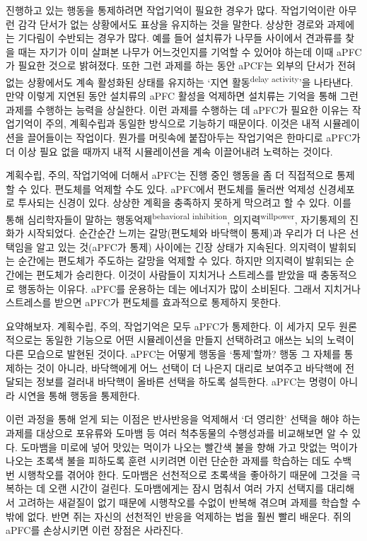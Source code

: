 \documentclass[openany]{book}
\begin{document}
\begin{appendices}
진행하고 있는 행동을 통제하려면 작업기억이 필요한 경우가 많다. 작업기억이란 아무런 감각 단서가 없는 상황에서도 표상을 유지하는 것을 말한다. 상상한 경로와 과제에는 기다림이 수반되는 경우가 많다. 예를 들어 설치류가 나무들 사이에서 견과류를 찾을 때는 자기가 이미 살펴본 나무가 어느것인지를 기억할 수 있어야 하는데 이때 aPFC가 필요한 것으로 밝혀졌다. 또한 그런 과제를 하는 동안 aPCF는 외부의 단서가 전혀 없는 상황에서도 계속 활성화된 상태를 유지하는 `지연 활동\textsuperscript{delay activity}’을 나타낸다. 만약 이렇게 지연된 동안 설치류의 aPFC 활성을 억제하면 설치류는 기억을 통해 그런 과제를 수행하는 능력을 상실한다. 이런 과제를 수행하는 데 aPFC가 필요한 이유는 작업기억이 주의, 계획수립과 동일한 방식으로 기능하기 때문이다. 이것은 내적 시뮬레이션을 끌어들이는 작업이다. 뭔가를 머릿속에 붙잡아두는 작업기억은 한마디로 aPFC가 더 이상 필요 없을 때까지 내적 시뮬레이션을 계속 이끌어내려 노력하는 것이다.

계획수립, 주의, 작업기억에 더해서 aPFC는 진행 중인 행동을 좀 더 직접적으로 통제할 수 있다. 편도체를 억제할 수도 있다. aPFC에서 편도체를 둘러싼 억제성 신경세포로 투사되는 신경이 있다. 상상한 계획을 충족하지 못하게 막으려고 할 수 있다. 이를 통해 심리학자들이 말하는 행동억제\textsuperscript{behavioral inhibition}, 의지력\textsuperscript{willpower}, 자기통제의 진화가 시작되었다. 순간순간 느끼는 갈망(편도체와 바닥핵이 통제)과 우리가 더 나은 선택임을 알고 있는 것(aPFC가 통제) 사이에는 긴장 상태가 지속된다. 의지력이 발휘되는 순간에는 편도체가 주도하는 갈망을 억제할 수 있다. 하지만 의지력이 발휘되는 순간에는 편도체가 승리한다. 이것이 사람들이 지치거나 스트레스를 받았을 때 충동적으로 행동하는 이유다. aPFC를 운용하는 데는 에너지가 많이 소비된다. 그래서 지치거나 스트레스를 받으면 aPFC가 편도체를 효과적으로 통제하지 못한다.

요약해보자. 계획수립, 주의, 작업기억은 모두 aPFC가 통제한다. 이 세가지 모두 원론적으로는 동일한 기능으로 어떤 시뮬레이션을 만들지 선택하려고 애쓰는 뇌의 노력이 다른 모습으로 발현된 것이다. aPFC는 어떻게 행동을 `통제’할까? 행동 그 자체를 통제하는 것이 아니라, 바닥핵에게 어느 선택이 더 나은지 대리로 보여주고 바닥핵에 전달되는 정보를 걸러내 바닥핵이 올바른 선택을 하도록 설득한다. aPFC는 명령이 아니라 시연을 통해 행동을 통제한다.

이런 과정을 통해 얻게 되는 이점은 반사반응을 억제해서 `더 영리한’ 선택을 해야 하는 과제를 대상으로 포유류와 도마뱀 등 여러 척추동물의 수행성과를 비교해보면 알 수 있다. 도마뱀을 미로에 넣어 맛있는 먹이가 나오는 빨간색 불을 향해 가고 맛없는 먹이가 나오는 초록색 불을 피하도록 훈련 시키려면 이런 단순한 과제를 학습하는 데도 수백 번 시행착오를 겪어야 한다. 도마뱀은 선천적으로 초록색을 좋아하기 때문에 그것을 극복하는 데 오랜 시간이 걸린다. 도마뱀에게는 잠시 멈춰서 여러 가지 선택지를 대리해서 고려하는 새겉질이 없기 때문에 시행착오를 수없이 반복해 겪으며 과제를 학습할 수밖에 없다. 반면 쥐는 자신의 선천적인 반응을 억제하는 법을 훨씬 빨리 배운다. 쥐의 aPFC를 손상시키면 이런 장점은 사라진다.


\end{appendices}
\end{document}
